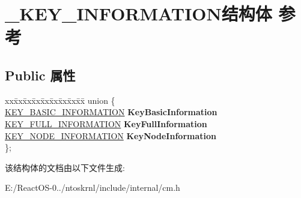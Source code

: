 \hypertarget{struct___k_e_y___i_n_f_o_r_m_a_t_i_o_n}{}\section{\+\_\+\+K\+E\+Y\+\_\+\+I\+N\+F\+O\+R\+M\+A\+T\+I\+O\+N结构体 参考}
\label{struct___k_e_y___i_n_f_o_r_m_a_t_i_o_n}
\subsection*{Public 属性}
\begin{DoxyCompactItemize}
\item 
\mbox{\label{struct___k_e_y___i_n_f_o_r_m_a_t_i_o_n_ab247f204a238a4a4fa46bbd57fa43d18}} 
\begin{tabbing}
xx\=xx\=xx\=xx\=xx\=xx\=xx\=xx\=xx\=\kill
union \{\\
\>\hyperlink{struct___k_e_y___b_a_s_i_c___i_n_f_o_r_m_a_t_i_o_n}{KEY\_BASIC\_INFORMATION} {\bfseries KeyBasicInformation}\\
\>\hyperlink{struct___k_e_y___f_u_l_l___i_n_f_o_r_m_a_t_i_o_n}{KEY\_FULL\_INFORMATION} {\bfseries KeyFullInformation}\\
\>\hyperlink{struct___k_e_y___n_o_d_e___i_n_f_o_r_m_a_t_i_o_n}{KEY\_NODE\_INFORMATION} {\bfseries KeyNodeInformation}\\
\}; \\

\end{tabbing}\end{DoxyCompactItemize}


该结构体的文档由以下文件生成\+:\begin{DoxyCompactItemize}
\item 
E\+:/\+React\+O\+S-\/0../ntoskrnl/include/internal/cm.\+h\end{DoxyCompactItemize}
